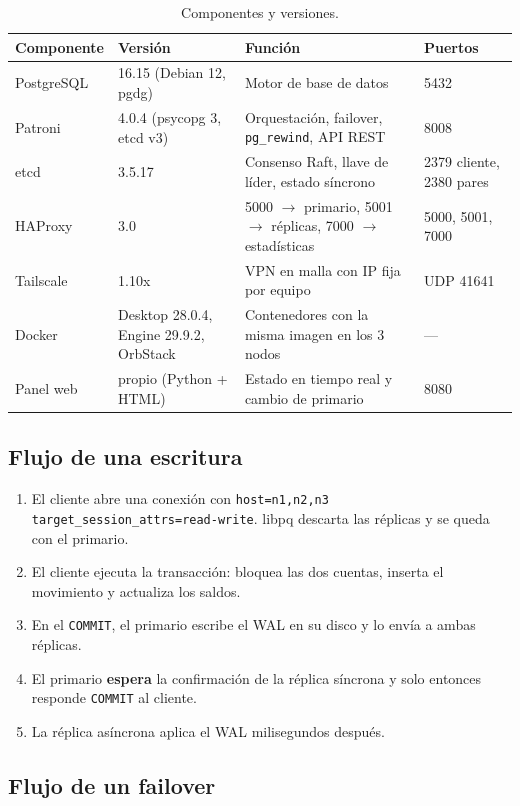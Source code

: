 \documentclass[11pt,a4paper]{article}
\newcommand{\cod}[1]{\texttt{#1}}
\newcommand{\flecha}{\ensuremath{\rightarrow}}
\begin{document}
\begin{table}[H]
\centering
\small
\caption{Componentes y versiones.}
\begin{tabularx}{\textwidth}{@{}lL{3.6cm}YL{2.6cm}@{}}
\toprule
\textbf{Componente} & \textbf{Versión} & \textbf{Función} & \textbf{Puertos} \\
\midrule
PostgreSQL & 16.15 (Debian 12, pgdg) & Motor de base de datos & 5432 \\
Patroni & 4.0.4 (psycopg 3, etcd v3) & Orquestación, failover, \cod{pg\_rewind}, API REST & 8008 \\
etcd & 3.5.17 & Consenso Raft, llave de líder, estado síncrono & 2379 cliente, 2380 pares \\
HAProxy & 3.0 & 5000 \flecha{} primario, 5001 \flecha{} réplicas, 7000 \flecha{} estadísticas & 5000, 5001, 7000 \\
Tailscale & 1.10x & VPN en malla con IP fija por equipo & UDP 41641 \\
Docker & Desktop 28.0.4, Engine 29.9.2, OrbStack & Contenedores con la misma imagen en los 3 nodos & --- \\
Panel web & propio (Python + HTML) & Estado en tiempo real y cambio de primario & 8080 \\
\bottomrule
\end{tabularx}
\end{table}

\subsection{Flujo de una escritura}

\begin{enumerate}
  \item El cliente abre una conexión con \cod{host=n1,n2,n3 target\_session\_attrs=read-write}. libpq descarta las réplicas y se queda con el primario.
  \item El cliente ejecuta la transacción: bloquea las dos cuentas, inserta el movimiento y actualiza los saldos.
  \item En el \cod{COMMIT}, el primario escribe el WAL en su disco y lo envía a ambas réplicas.
  \item El primario \textbf{espera} la confirmación de la réplica síncrona y solo entonces responde \cod{COMMIT} al cliente.
  \item La réplica asíncrona aplica el WAL milisegundos después.
\end{enumerate}

\subsection{Flujo de un failover}
\end{document}
